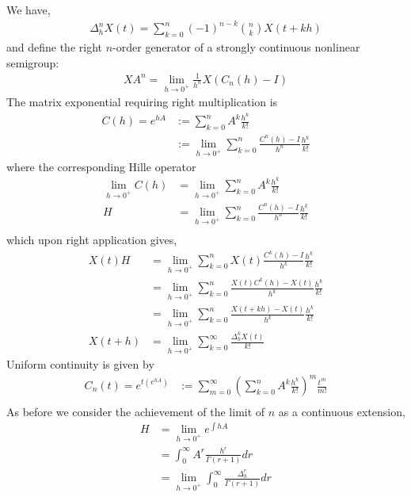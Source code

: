 \documentclass{article}
\begin{document}
We have,
\begin{align*}
    \Delta_h^n X(t) = \sum_{k=0}^n (-1)^{n-k} {n \choose k} X(t+kh)
\end{align*}
and define the right $n$-order generator of a strongly continuous nonlinear semigroup:
\begin{align*}
    X A^n = \lim_{h\rightarrow0^+} \frac{1}{h^n} X (C_n(h) - I)
\end{align*}
The matrix exponential requiring right multiplication is
\begin{align*}
    C(h) = e^{hA} &:= \sum_{k=0}^n  A^k \frac{h^k}{k!}\\
     &:= \lim_{h\rightarrow0^+} \sum_{k=0}^n  \frac{C^n(h) - I}{h^n} \frac{h^k}{k!}
\end{align*}
where the corresponding Hille operator
\begin{align*}
    \lim_{h\rightarrow0^+} C(h) &= \lim_{h\rightarrow0^+} \sum_{k=0}^n A^k \frac{h^k}{k!}  \\
    H &= \lim_{h\rightarrow0^+} \sum_{k=0}^n \frac{C^n(h) - I}{h^n} \frac{h^k}{k!} \\
\end{align*}
which upon right application gives, 
\begin{align*}
    X(t) H &= \lim_{h\rightarrow0^+} \sum_{k=0}^n X(t)  \frac{C^k(h) - I}{h^k} \frac{h^k}{k!} \\
     &= \lim_{h\rightarrow0^+} \sum_{k=0}^n  \frac{X(t) C^k(h) - X(t)}{h^k} \frac{h^k}{k!}\\
      &= \lim_{h\rightarrow0^+} \sum_{k=0}^n  \frac{X(t+kh) - X(t)}{h^k} \frac{h^k}{k!}\\
    X(t+h) &= \lim_{h\rightarrow0^+} \sum_{k=0}^\infty \frac{\Delta_h^k X(t) }{k!} 
\end{align*}
Uniform continuity is given by
\begin{align*}
    C_n(t) = e^{t(e^{hA})} &:= \sum_{m=0}^\infty  \left(\sum_{k=0}^n  A^k \frac{h^k}{k!}\right)^m \frac{t^m}{m!}\\
\end{align*}
As before we consider the achievement of the limit of $n$ as a continuous extension,
\begin{align*}
    H &= \lim_{h\rightarrow0^+}  e^{\int hA}\\
    &= \int_0^\infty  A^r \frac{h^r}{\Gamma(r+1)} dr\\
    &=\lim_{h\rightarrow0^+} \int_0^\infty \frac{\Delta^r_h}{\Gamma(r+1)} dr
\end{align*}
\end{document}
